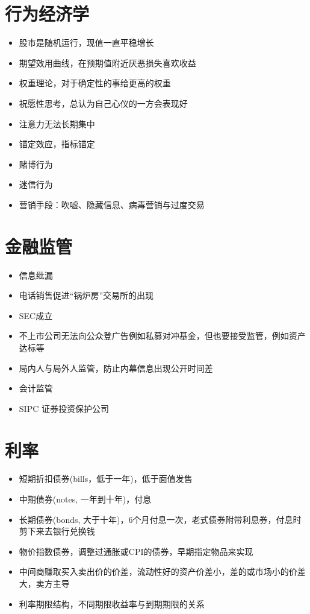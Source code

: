 \documentclass[]{book}
\providecommand{\tightlist}{%
  \setlength{\itemsep}{0pt}\setlength{\parskip}{0pt}}
\begin{document}
\section{行为经济学}

\begin{itemize}
\tightlist
\item
  股市是随机运行，现值一直平稳增长
\item
  期望效用曲线，在预期值附近厌恶损失喜欢收益
\item
  权重理论，对于确定性的事给更高的权重
\item
  祝愿性思考，总认为自己心仪的一方会表现好
\item
  注意力无法长期集中
\item
  锚定效应，指标锚定
\item
  赌博行为
\item
  迷信行为
\item
  营销手段：吹嘘、隐藏信息、病毒营销与过度交易
\end{itemize}

\section{金融监管}

\begin{itemize}
\tightlist
\item
  信息纰漏
\item
  电话销售促进``锅炉房''交易所的出现
\item
  SEC成立
\item
  不上市公司无法向公众登广告例如私募对冲基金，但也要接受监管，例如资产达标等
\item
  局内人与局外人监管，防止内幕信息出现公开时间差
\item
  会计监管
\item
  SIPC 证券投资保护公司
\end{itemize}

\section{利率}

\begin{itemize}
\tightlist
\item
  短期折扣债券(bills，低于一年)，低于面值发售
\item
  中期债券(notes, 一年到十年)，付息
\item
  长期债券(bonds, 大于十年)，6个月付息一次，老式债券附带利息券，付息时剪下来去银行兑换钱
\item
  物价指数债券，调整过通胀或CPI的债券，早期指定物品来实现
\item
  中间商赚取买入卖出价的价差，流动性好的资产价差小，差的或市场小的价差大，卖方主导
\item
  利率期限结构，不同期限收益率与到期期限的关系
\end{itemize}
\end{document}
